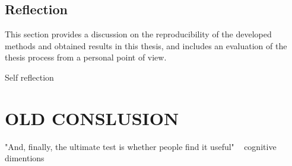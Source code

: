 \section{Reflection}
\label{sec:reflection}

This section provides a discussion on the reproducibility of the developed methods and obtained results in this thesis, and includes an evaluation of the thesis process from a personal point of view.

Self reflection 



\chapter{OLD CONSLUSION}

"And, finally, the ultimate test is whether people find it useful" ~ cognitive dimentions










